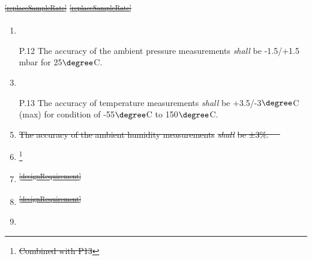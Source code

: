 \documentclass[a4paper,12pt,twoside]{article}
\providecommand{\DIFdeltex}[1]{{\protect\color{red}\sout{#1}}}                      %
\providecommand{\DIFaddbegin}{} %
\providecommand{\DIFaddend}{} %
\providecommand{\DIFdelbegin}{} %
\providecommand{\DIFdelend}{} %
\providecommand{\DIFdel}[1]{\texorpdfstring{\DIFdeltex{#1}}{}} %
\newcommand{\DIFscaledelfig}{0.5}
\newlength{\DIFdelgraphicswidth} %
\newlength{\DIFdelgraphicsheight} %
\newcommand{\DIFaddincludegraphics}[2][]{{\color{blue}\fbox{\DIFOincludegraphics[#1]{#2}}}} %
\newcommand{\DIFdelincludegraphics}[2][]{%
\sbox{\DIFdelgraphicsbox}{\DIFOincludegraphics[#1]{#2}}%
\settoboxwidth{\DIFdelgraphicswidth}{\DIFdelgraphicsbox} %
\settoboxtotalheight{\DIFdelgraphicsheight}{\DIFdelgraphicsbox} %
\scalebox{\DIFscaledelfig}{%
\parbox[b]{\DIFdelgraphicswidth}{\usebox{\DIFdelgraphicsbox}\\[-\baselineskip] \rule{\DIFdelgraphicswidth}{0em}}\llap{\resizebox{\DIFdelgraphicswidth}{\DIFdelgraphicsheight}{%
\setlength{\unitlength}{\DIFdelgraphicswidth}%
\begin{picture}(1,1)%
\thicklines\linethickness{2pt} %
{\color[rgb]{1,0,0}\put(0,0){\framebox(1,1){}}}%
{\color[rgb]{1,0,0}\put(0,0){\line( 1,1){1}}}%
{\color[rgb]{1,0,0}\put(0,1){\line(1,-1){1}}}%
\end{picture}%
}\hspace*{3pt}}} %
} %
\DeclareRobustCommand{\DIFaddbegin}{\DIFOaddbegin \let\includegraphics\DIFaddincludegraphics} %
\DeclareRobustCommand{\DIFaddend}{\DIFOaddend \let\includegraphics\DIFOincludegraphics} %
\DeclareRobustCommand{\DIFdelbegin}{\DIFOdelbegin \let\includegraphics\DIFdelincludegraphics} %
\DeclareRobustCommand{\DIFdelend}{\DIFOaddend \let\includegraphics\DIFOincludegraphics} %
\begin{document}
\DIFdel{\textsuperscript{\ref{replaceSampleRate}}
    }%
\DIFdel{\textsuperscript{\ref{replaceSampleRate}}
    }\DIFdelend \DIFaddbegin \begin{enumerate}
    \DIFaddend %
    \DIFdelbegin %
\item%
\DIFdelend \DIFaddbegin \item[P.12] \DIFaddend The accuracy of the ambient pressure measurements \textit{shall} be -1.5/+1.5 mbar for 25$\degree$C.
    \DIFdelbegin %
\item%
\DIFdelend \DIFaddbegin \item[P.13] \DIFaddend The accuracy of temperature measurements \textit{shall} be +3.5/-3$\degree$C (max) for condition of -55$\degree$C to 150$\degree$C.
    \DIFdelbegin %
\item%
\DIFdel{The accuracy of the ambient humidity measurements }\textit{\DIFdel{shall}} %
\DIFdel{be ±3\%. \mbox{%
\cite{Humiditysensor}
    }\hspace{0pt}%
}%
\item%
\footnote{\DIFdel{Combined with P13}%
}
\addtocounter{footnote}{-1}%
\item%
\DIFdel{\textsuperscript{\ref{designRequirement}}
    }%
\item%
\DIFdel{\textsuperscript{\ref{designRequirement}}
    }%
\item%

\end{enumerate}
\end{document}
